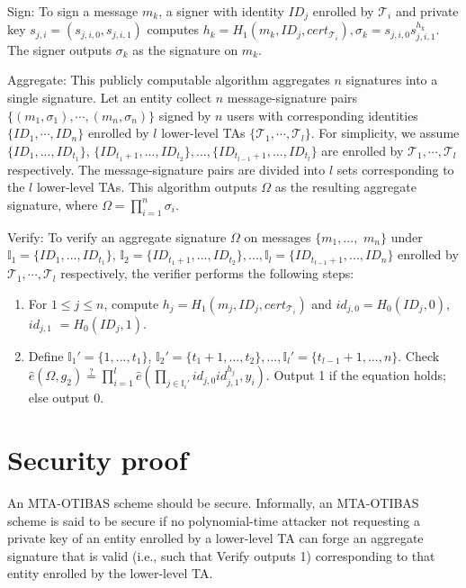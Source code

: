 \documentclass[10pt,journal,compsoc]{IEEEtran}
\begin{document}
\smallskip
{\sf Sign}:
\smallskip
To sign a message $m_k$, a signer with identity $ID_j$ enrolled by
$\mathcal{T}_i$ and private key $s_{j,i}=(s_{j,i,0},s_{j,i,1})$
computes
$h_k=H_1(m_k,ID_j,cert_{\mathcal{T}_i}),\sigma_k=s_{j,i,0}s_{j,i,1}^{h_k}.$
The signer outputs $\sigma_k$ as the signature on $m_k$.

\smallskip
{\sf Aggregate}:
\smallskip
This publicly computable algorithm aggregates $n$ signatures into a
single signature. Let an entity collect $n$ message-signature pairs
$\{(m_1, \sigma_1), \cdots, (m_n, \sigma_n)\}$ signed by $n$ users
with corresponding identities $\{ID_1, \cdots, ID_n\}$ enrolled by
$l$ lower-level TAs $\{\mathcal{T}_1, \cdots, \mathcal{T}_l\}$. For
simplicity, we assume $\{ID_1,...,ID_{t_1}\}$,
$\{ID_{t_1+1},...,ID_{t_2}\} ,...,\{ID_{t_{l-1}+1},...,ID_{t_l}\}$
are enrolled by $\mathcal{T}_1, \cdots, \mathcal{T}_l$ respectively.
The message-signature pairs are divided into $l$ sets corresponding
to the $l$ lower-level TAs. This algorithm outputs $\Omega$ as the
resulting aggregate signature, where $\Omega=\prod_{i=1}^n
\sigma_i$.


\smallskip
{\sf Verify}:
\smallskip
To verify an aggregate signature $\Omega$ on messages $\{m_1,...,$
$m_n\}$ under $\mathbb{I}_1=\{ID_1,...,ID_{t_1}\}$,
$\mathbb{I}_2=\{ID_{t_1+1},...,ID_{t_2}\}
,...,\mathbb{I}_l=\{ID_{t_{l-1}+1},...,ID_n\}$ enrolled by
$\mathcal{T}_1, \cdots, \mathcal{T}_l$ respectively, the verifier
performs the following steps:
    \begin{enumerate}
      \item For $1\leq j\leq n$, compute $h_j=H_1(m_j,ID_j,cert_{\mathcal{T}_i})$ and
      $id_{j,0}=H_0(ID_j,0)$, $id_{j,1}$ $=H_0(ID_j,1)$.

      \item Define $\mathbb{I}_1'=\{1,...,t_1\}$,
$\mathbb{I}_2'=\{t_1+1,...,t_2\}
,...,\mathbb{I}_l'=\{t_{l-1}+1,...,n\}$. Check
$\hat{e}(\Omega,g_2)\stackrel{?}{=}\prod_{i=1}^l \hat{e}(\prod_{j\in \mathbb{I}_i'}id_{j,0}
      id_{j,1}^{h_j},y_i).$ Output 1 if the equation holds; else output 0.
      \end{enumerate}

\section{Security proof}\label{correctness and
security}

An MTA-OTIBAS scheme should be secure.
Informally, an MTA-OTIBAS scheme is said to be secure if no
polynomial-time attacker not requesting a private key of an entity
enrolled by a lower-level TA can forge an aggregate signature that
is valid
 (i.e., such that {\sf Verify} outputs 1) corresponding to that entity
enrolled by the lower-level TA.
\end{document}
